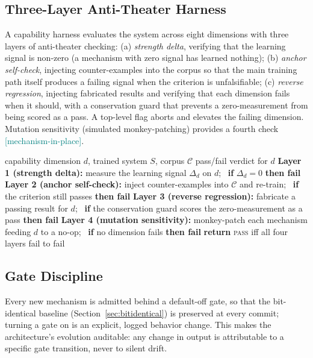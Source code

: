 \documentclass[11pt,a4paper]{article}
\newcommand{\statusmech}{\textcolor{teal}{\small\textsf{[mechanism-in-place]}}}
\begin{document}
\subsection{Three-Layer Anti-Theater Harness}
A capability harness evaluates the system across eight dimensions with
three layers of anti-theater checking: (a) \emph{strength delta},
verifying that the learning signal is non-zero (a mechanism with zero
signal has learned nothing); (b) \emph{anchor self-check}, injecting
counter-examples into the corpus so that the main training path itself
produces a failing signal when the criterion is unfalsifiable; (c)
\emph{reverse regression}, injecting fabricated results and verifying
that each dimension fails when it should, with a conservation guard that
prevents a zero-measurement from being scored as a pass. A top-level
flag aborts and elevates the failing dimension. Mutation sensitivity
(simulated monkey-patching) provides a fourth check \statusmech.

\begin{algorithm}[t]
\caption{Three-layer anti-theater capability check}
\label{alg:antitheater}
\begin{algorithmic}[1]
\Require capability dimension $d$, trained system $S$, corpus $\mathcal{C}$
\Ensure pass/fail verdict for $d$
\State \textbf{Layer 1 (strength delta):} measure the learning signal
$\Delta_d$ on $d$; \ \textbf{if} $\Delta_d = 0$ \textbf{then fail}
\State \textbf{Layer 2 (anchor self-check):} inject counter-examples
into $\mathcal{C}$ and re-train; \ \textbf{if} the criterion still passes
\textbf{then fail} 
\State \textbf{Layer 3 (reverse regression):} fabricate a passing result
for $d$; \ \textbf{if} the conservation guard scores the zero-measurement
as a pass \textbf{then fail} 
\State \textbf{Layer 4 (mutation sensitivity):} monkey-patch each
mechanism feeding $d$ to a no-op; \ \textbf{if} no dimension fails
\textbf{then fail} 
\State \textbf{return} \textsc{pass} iff all four layers fail to fail
\end{algorithmic}
\end{algorithm}

\subsection{Gate Discipline}
Every new mechanism is admitted behind a default-off gate, so that the
bit-identical baseline (Section~\ref{sec:bitidentical}) is preserved at
every commit; turning a gate on is an explicit, logged behavior change.
This makes the architecture's evolution auditable: any change in output
is attributable to a specific gate transition, never to silent drift.
\end{document}
